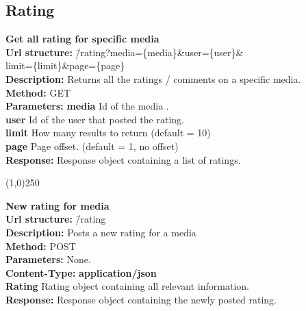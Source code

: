 \documentclass[11pt]{article}
\begin{document}
\subsection{Rating}

\begin{tabbing}
\textbf{Get all rating for specific media} \\
\textcolor{black!60}{\textbf{Url structure:}} \hspace{0.2in} \= /rating?media=\{media\}\&user=\{user\}\& \\
\> limit=\{limit\}\&page=\{page\} \\
\textcolor{black!60}{\textbf{Description:}}  \> Returns all the ratings / comments on a specific media. \\
\textcolor{black!60}{\textbf{Method:}} \> GET \\
\textcolor{black!60}{\textbf{Parameters:}} \> \textbf{media} Id of the media . \\
\> \textbf{user} Id of the user that posted the rating. \\
\> \textbf{limit} How many results to return (default = 10) \\
\> \textbf{page} Page offset. (default = 1, no offset) \\
\textcolor{black!60}{\textbf{Response:}} \> Response object containing a list of ratings.
\end{tabbing}

\begin{center}\line(1,0){250}\end{center}

\begin{tabbing}
\textbf{New rating for media} \\
\textcolor{black!60}{\textbf{Url structure:}} \hspace{0.2in} \= /rating \\
\textcolor{black!60}{\textbf{Description:}}  \> Posts a new rating for a media \\
\textcolor{black!60}{\textbf{Method:}} \> POST \\
\textcolor{black!60}{\textbf{Parameters:}} \> None. \\
\textcolor{black!60}{\textbf{Content-Type:}} \> \textbf{application/json} \\
\> \textbf{Rating} Rating object containing all relevant information. \\
\textcolor{black!60}{\textbf{Response:}} \> Response object containing the newly posted rating.
\end{tabbing}
\end{document}
